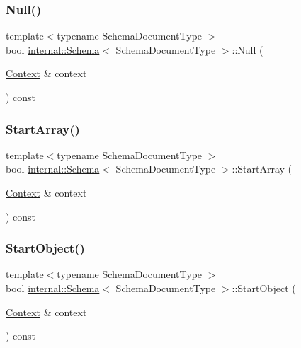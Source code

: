 \subsubsection{\texorpdfstring{Null()}{Null()}}
{\footnotesize\ttfamily template$<$typename Schema\+Document\+Type $>$ \\
bool \hyperlink{classinternal_1_1Schema}{internal\+::\+Schema}$<$ Schema\+Document\+Type $>$\+::Null (\begin{DoxyParamCaption}\item[{\hyperlink{classinternal_1_1Schema_ac3f54abfefe300c5610c1205869cfd66}{Context} \&}]{context }\end{DoxyParamCaption}) const\hspace{0.3cm}{\ttfamily [inline]}}

\mbox{\label{classinternal_1_1Schema_a094fbac3c04493aae304ef3011866f34}} 
\subsubsection{\texorpdfstring{Start\+Array()}{StartArray()}}
{\footnotesize\ttfamily template$<$typename Schema\+Document\+Type $>$ \\
bool \hyperlink{classinternal_1_1Schema}{internal\+::\+Schema}$<$ Schema\+Document\+Type $>$\+::Start\+Array (\begin{DoxyParamCaption}\item[{\hyperlink{classinternal_1_1Schema_ac3f54abfefe300c5610c1205869cfd66}{Context} \&}]{context }\end{DoxyParamCaption}) const\hspace{0.3cm}{\ttfamily [inline]}}

\mbox{\label{classinternal_1_1Schema_a124c90c0b46d8a06ae5c0314467b6363}} 
\subsubsection{\texorpdfstring{Start\+Object()}{StartObject()}}
{\footnotesize\ttfamily template$<$typename Schema\+Document\+Type $>$ \\
bool \hyperlink{classinternal_1_1Schema}{internal\+::\+Schema}$<$ Schema\+Document\+Type $>$\+::Start\+Object (\begin{DoxyParamCaption}\item[{\hyperlink{classinternal_1_1Schema_ac3f54abfefe300c5610c1205869cfd66}{Context} \&}]{context }\end{DoxyParamCaption}) const\hspace{0.3cm}{\ttfamily [inline]}}

